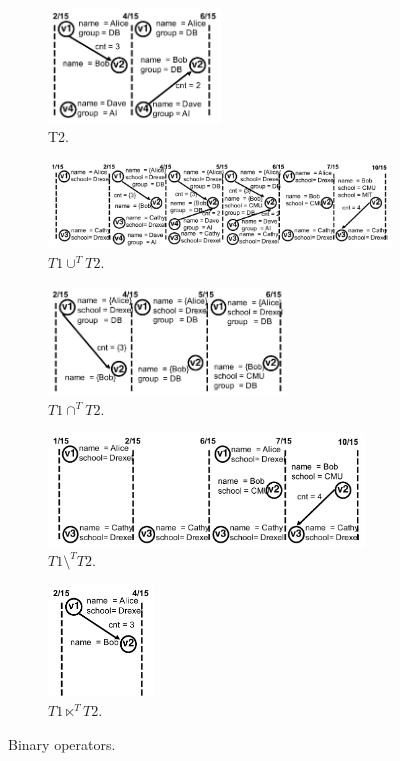 \begin{figure}
\begin{subfigure}{2in}
\includegraphics[width=1.8in]{figs/T2_graphs.pdf}
\caption{T2.}
\label{fig:tg_t2}
\end{subfigure}
\begin{subfigure}{5in}
\includegraphics[width=4.9in]{figs/T1_union_T2.pdf}
\caption{$T1 \cup^T T2.$}
\label{fig:tg_union}
\end{subfigure}
\begin{subfigure}{2.5in}
\includegraphics[width=2.5in]{figs/T1_inter_T2.pdf}
\caption{$T1 \cap^T T2$.}
\vspace{-0.2cm}
\label{fig:tg_inter}
\end{subfigure}
\begin{subfigure}{3.3in}
\includegraphics[width=3.3in]{figs/T1_diff_T2.pdf}
\caption{$T1 \setminus^T T2$.}
\vspace{-0.2cm}
\label{fig:tg_diff}
\end{subfigure}
\begin{subfigure}{1.1in}
\includegraphics[width=1.1in]{figs/T1_semij_T2.pdf}
\caption{$T1 \ltimes^T T2$.}
\vspace{-0.2cm}
\label{fig:tg_semij}
\end{subfigure}
\caption{Binary operators.}
\label{fig:binary}
\vspace{-0.2cm}
\end{figure}

